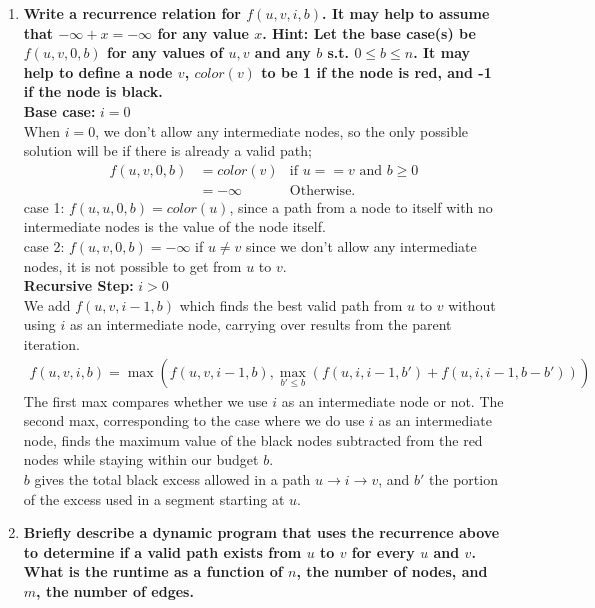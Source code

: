 \documentclass{article}
\begin{document}
\begin{enumerate}
\begin{enumerate}
\newpage 
\item \textbf{Write a recurrence relation for $f(u,v,i,b)$. It may help to assume that $- \infty + x = - \infty$ for any value $x$. Hint: Let the base case(s) be $f(u,v,0,b)$ for any values of $u,v$ and any $b$ s.t. $0 \leq b \leq n$. It may help to define a node $v$, $color(v)$ to be 1 if the node is red, and -1 if the node is black. } \\

\textbf{Base case: } $i=0$ \\
When $i=0$, we don't allow any intermediate nodes, so the only possible solution will be if there is already a valid path; 
\begin{align*}
    f(u,v,0,b) & = color(v) & \text{if } u == v \text{ and } b \geq 0 \\
    & = - \infty & \text{Otherwise.}
\end{align*}
case 1: $f(u,u,0,b) = color(u)$, since a path from a node to itself with no intermediate nodes is the value of the node itself. \\
case 2: $f(u,v,0,b) = - \infty$ if $u \neq v$ since we don't allow any intermediate nodes, it is not possible to get from $u$ to $v$. \\

\textbf{Recursive Step: } $i > 0$ \\
We add $f(u,v,i-1,b)$ which finds the best valid path from $u$ to $v$ without using $i$ as an intermediate node, carrying over results from the parent iteration.
\begin{align*}
    f(u,v,i,b) = \max( f(u,v,i-1,b), \max_{b' \leq b}( f(u,i,i-1,b') + f(u,i,i-1,b-b') ) )
\end{align*}
The first max compares whether we use $i$ as an intermediate node or not. The second max, corresponding to the case where we do use $i$ as an intermediate node, finds the maximum value of the black nodes subtracted from the red nodes while staying within our budget $b$. \\
\newline
$b$ gives the total black excess allowed in a path $u \rightarrow i \rightarrow  v$, and $b'$ the portion of the excess used in a segment starting at $u$. \\







\item \textbf{Briefly describe a dynamic program that uses the recurrence above to determine if a valid path exists from $u$ to $v$ for every $u$ and $v$. What is the runtime as a function of $n$, the number of nodes, and $m$, the number of edges.} \\


\end{enumerate}
\end{enumerate}
\end{document}
